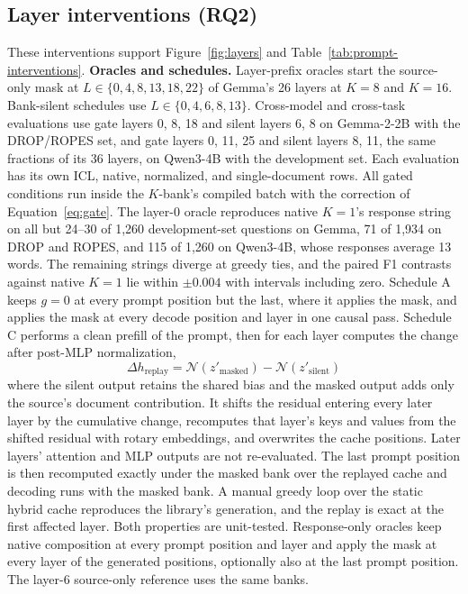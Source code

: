 \subsection{Layer interventions (RQ2)}
\label{sec:composition-details}
These interventions support Figure~\ref{fig:layers}
and Table~\ref{tab:prompt-interventions}.
\textbf{Oracles and schedules.} Layer-prefix oracles start the source-only mask at
$L\in\{0,4,8,13,18,22\}$ of Gemma's 26 layers at $K=8$ and $K=16$. Bank-silent
schedules use $L\in\{0,4,6,8,13\}$. Cross-model and cross-task evaluations use gate layers 0, 8, 18 and
silent layers 6, 8 on Gemma-2-2B with the DROP/ROPES set, and gate layers 0, 11, 25 and
silent layers 8, 11, the same fractions of its 36 layers, on Qwen3-4B with the
development set. Each evaluation has its own ICL, native, normalized, and single-document
rows. All gated conditions run inside the $K$-bank's
compiled batch with the correction of Equation~\ref{eq:gate}. The layer-0 oracle
reproduces native $K=1$'s response string on all but 24--30 of 1,260 development-set
questions on Gemma, 71 of 1,934 on DROP and ROPES, and 115 of 1,260 on Qwen3-4B,
whose responses average 13 words. The remaining strings diverge at greedy ties, and
the paired F1 contrasts against native $K=1$ lie within $\pm0.004$ with intervals
including zero. Schedule A keeps $g=0$ at every prompt position but the
last, where it applies the mask, and applies the mask at every decode position and
layer in one causal pass. Schedule C performs a clean prefill of the prompt, then for
each layer computes the change after post-MLP normalization,
\begin{equation}
\Delta h_{\mathrm{replay}}
=\mathcal{N}(z'_{\mathrm{masked}})-\mathcal{N}(z'_{\mathrm{silent}})
\label{eq:cache-replay}
\end{equation}
where the silent output retains the shared bias and the masked output adds
only the source's document contribution. It shifts the residual entering
every later layer by the cumulative change, recomputes that layer's keys and values
from the shifted residual with rotary embeddings, and overwrites the cache positions.
Later layers' attention and MLP outputs are not re-evaluated. The last prompt
position is then recomputed exactly under the masked bank over the replayed cache
and decoding runs with the masked bank. A manual greedy loop over the static hybrid
cache reproduces the library's generation, and the replay is exact at the first
affected layer. Both properties are unit-tested. Response-only oracles keep native composition
at every prompt position and layer and apply the mask at every layer of the generated
positions, optionally also at the last prompt position. The layer-6 source-only
reference uses the same banks.


